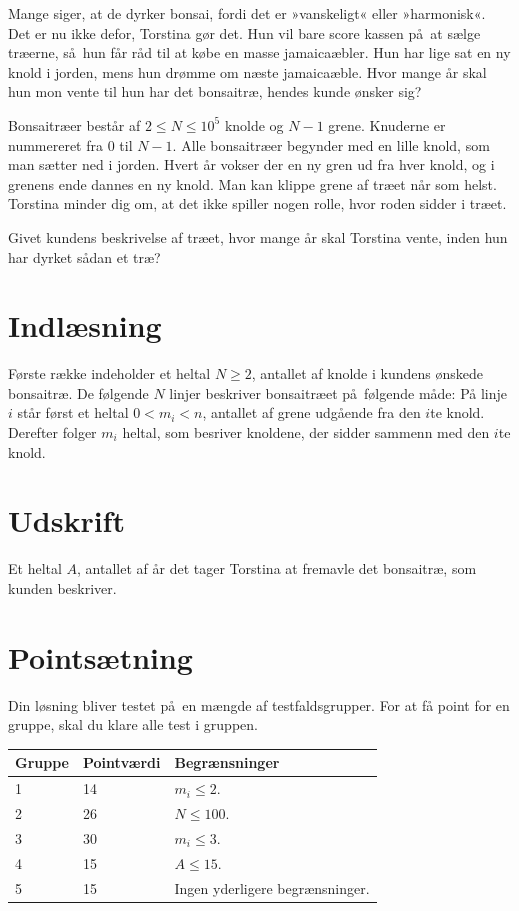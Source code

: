 
Mange siger, at de dyrker bonsai, fordi det er »vanskeligt« eller »harmonisk«.
Det er nu ikke defor, Torstina gør det.
Hun vil bare score kassen på at sælge træerne, så hun får råd til at købe en masse jamaicaæbler.
Hun har lige sat en ny knold i jorden, mens hun drømme om næste jamaicaæble.
Hvor mange år skal hun mon vente til hun har det bonsaitræ, hendes kunde ønsker sig?

Bonsaitræer består af $2\leq N \leq 10^5$ knolde og $N-1$ grene.
Knuderne er nummereret fra $0$ til $N-1$. 
Alle bonsaitræer begynder med en lille knold, som man sætter ned i jorden.
Hvert år vokser der en ny gren ud fra hver knold, og i grenens ende dannes en ny knold.
Man kan klippe grene af træet når som helst. 
Torstina minder dig om, at det ikke spiller nogen rolle, hvor roden sidder i træet.

Givet kundens beskrivelse af træet, hvor mange år skal Torstina vente, inden hun har dyrket sådan et træ?

\section*{Indlæsning}

Første række indeholder et heltal $N\geq 2$, antallet af knolde i kundens ønskede bonsaitræ.
De følgende $N$ linjer beskriver bonsaitræet på følgende måde:
På linje $i$ står først et heltal $0 < m_i < n$, antallet af grene udgående fra den $i$te knold. 
Derefter folger $m_i$ heltal, som besriver knoldene, der sidder sammenn med den $i$te knold.

\section*{Udskrift}
Et heltal $A$, antallet af år det tager Torstina at fremavle det bonsaitræ, som kunden beskriver.

\section*{Pointsætning}

Din løsning bliver testet på en mængde af testfaldsgrupper.
For at få point for en gruppe, skal du klare alle test i gruppen. 

\noindent
\begin{tabular}{| l | l | l |}
\hline
Gruppe & Pointværdi & Begrænsninger \\ \hline
1     & 14         &  $m_i\leq 2$.\\ \hline
2     & 26         &  $N \leq 100$. \\ \hline
3     & 30         &  $m_i \leq 3$. \\ \hline
4     & 15          &  $A \leq 15$. \\ \hline
5     & 15          &  Ingen yderligere begrænsninger. \\ \hline
\end{tabular}

